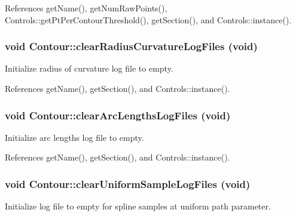 References getName(), getNumRawPoints(), Controls::getPtPerContourThreshold(), getSection(), and Controls::instance().\hypertarget{classContour_291821fec6939f1b6111cac28b89d369}{
\subsubsection[clearRadiusCurvatureLogFiles]{\setlength{\rightskip}{0pt plus 5cm}void Contour::clearRadiusCurvatureLogFiles (void)}}
\label{classContour_291821fec6939f1b6111cac28b89d369}


Initialize radius of curvature log file to empty. 

References getName(), getSection(), and Controls::instance().\hypertarget{classContour_63a12b810dd16fd79d733c07aaf574f4}{
\subsubsection[clearArcLengthsLogFiles]{\setlength{\rightskip}{0pt plus 5cm}void Contour::clearArcLengthsLogFiles (void)}}
\label{classContour_63a12b810dd16fd79d733c07aaf574f4}


Initialize arc lengths log file to empty. 

References getName(), getSection(), and Controls::instance().\hypertarget{classContour_df18fdf2ea3bb8d78d2f305ab047d5a6}{
\subsubsection[clearUniformSampleLogFiles]{\setlength{\rightskip}{0pt plus 5cm}void Contour::clearUniformSampleLogFiles (void)}}
\label{classContour_df18fdf2ea3bb8d78d2f305ab047d5a6}


Initialize log file to empty for spline samples at uniform path parameter. 


